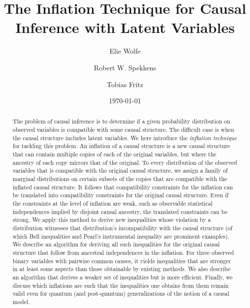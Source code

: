 \documentclass[aps,english,10pt,superscriptaddress,onecolumn,twoside,longbibliography,pra,floatfix,fleqn,nofootinbib]{revtex4-1}
\theoremstyle{definition}
\newcounter{example}[section]
\begin{document}
\title{The Inflation Technique for Causal Inference with Latent Variables}

\author{Elie Wolfe}

\author{Robert W. Spekkens}

\author{Tobias Fritz}

\date{\today}

\begin{abstract}

The problem of causal inference is to determine if a given probability distribution on observed variables is compatible with some causal structure. The difficult case is when the causal structure includes latent variables.  We here introduce the \emph{inflation technique} for tackling this problem. An inflation of a causal structure is a new causal structure that can contain multiple copies of each of the original variables, but where the ancestry of each copy mirrors that of the original. 
To every distribution of the observed variables that is compatible with the original causal structure, we assign a family of marginal distributions on certain subsets of the copies that are compatible with the inflated causal structure. It follows that compatibility constraints for the inflation can be translated into compatibility constraints for the original causal structure. 
Even if the constraints at the level of inflation are weak, such as observable statistical independences implied by disjoint causal ancestry, the translated constraints can be strong. We apply this method to derive new inequalities whose violation by a distribution witnesses that distribution's incompatibility with the causal structure (of which Bell inequalities and Pearl's instrumental inequality are prominent examples). We describe an algorithm for deriving all such inequalities for the original causal structure that follow from ancestral independences in the inflation. For three observed binary variables with pairwise common causes, it yields inequalities that are stronger in at least some aspects than those obtainable by existing methods. We also describe an algorithm that derives a weaker set of inequalities but is more efficient. Finally, we discuss which inflations are such that the inequalities one obtains from them remain valid even for quantum (and post-quantum) generalizations of the notion of a causal model.

\end{abstract}
\end{document}
